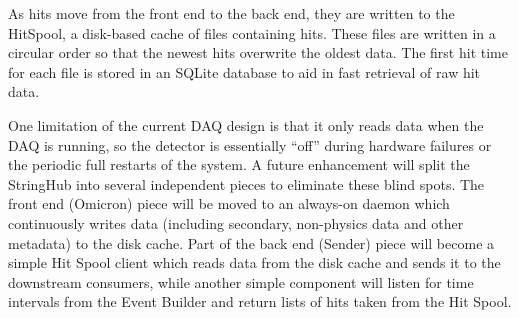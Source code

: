




As hits move from the front end to the back end, they are written to the
HitSpool, a disk-based cache of files containing hits.  These files are
written in a circular order so that the newest hits overwrite the oldest data.
The first hit time for each file is stored in an SQLite database to aid in fast
retrieval of raw hit data.

One limitation of the current DAQ design is that it only reads data when the
DAQ is running, so the detector is essentially ``off'' during hardware failures
or the periodic full restarts of the system.  A future enhancement will split
the StringHub into several independent pieces to eliminate these blind spots.
The front end (Omicron) piece will be moved to an always-on daemon which
continuously writes data (including secondary, non-physics data and other
metadata) to the disk cache.  Part of the back end (Sender) piece will become a
simple Hit Spool client which reads data from the disk cache and sends it to
the downstream consumers, while another simple component will listen for time
intervals from the Event Builder and return lists of hits taken from the
Hit Spool.

